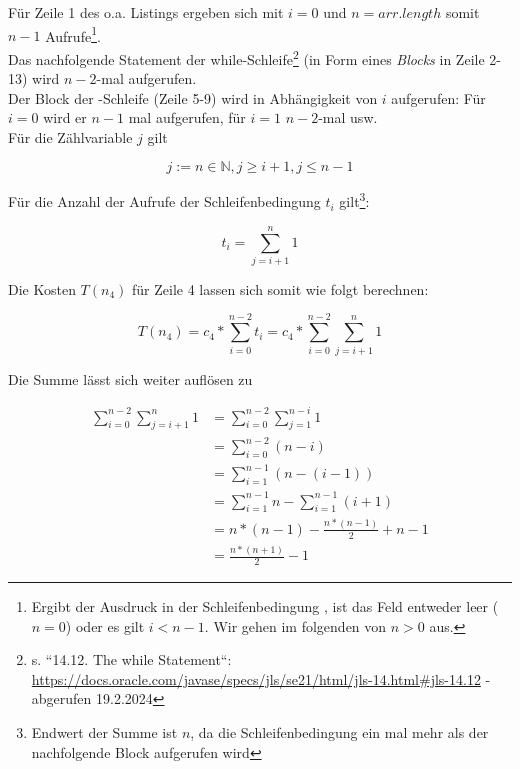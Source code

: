 \noindent
Für Zeile 1 des o.a. Listings ergeben sich mit $i = 0$ und $n=arr.length$ somit $n-1$ Aufrufe\footnote{
Ergibt der Ausdruck in der Schleifenbedingung , ist das Feld entweder leer ($n=0$) oder es gilt $i < n - 1$.
Wir gehen im folgenden von $n > 0$ aus.
}.\\
Das nachfolgende Statement der while-Schleife\footnote{
    s. ``14.12. The while Statement``: \url{https://docs.oracle.com/javase/specs/jls/se21/html/jls-14.html#jls-14.12} - abgerufen 19.2.2024
} (in Form eines \textit{Blocks} in Zeile 2-13) wird $n-2$-mal aufgerufen.\\
Der Block der -Schleife (Zeile 5-9) wird in Abhängigkeit von $i$ aufgerufen: Für $i = 0$ wird er $n - 1$ mal aufgerufen, für $i = 1$ $n - 2$-mal usw.\\

\noindent
Für die Zählvariable $j$ gilt

\begin{equation}
j := n \in \mathbb{N},  j \geq i+1, j \leq n-1
\end{equation}

\noindent
Für die Anzahl der Aufrufe der Schleifenbedingung $t_i$ gilt\footnote{Endwert der Summe ist $n$, da die Schleifenbedingung ein mal mehr als der nachfolgende Block aufgerufen wird}:

\begin{equation}
    t_i = \sum_{j=i+1}^{n} 1
\end{equation}

\noindent
Die Kosten $T(n_4)$ für Zeile 4 lassen sich somit wie folgt berechnen:

\begin{equation}
    T(n_4) = c_4 * \sum_{i=0}^{n-2} t_i = c_4 * \sum_{i=0}^{n-2} \sum_{j = i + 1}^{n} 1
\end{equation}

\noindent
Die Summe lässt sich weiter auflösen zu

\begin{equation}
\begin{split}
    \sum_{i=0}^{n-2} \sum_{j = i + 1}^{n} 1 &= \sum_{i=0}^{n-2} \sum_{j = 1}^{n-i} 1\\
    &= \sum_{i=0}^{n-2} (n - i)\\
    &= \sum_{i=1}^{n-1} (n - (i - 1)) \\
    &= \sum_{i=1}^{n-1} n - \sum_{i=1}^{n-1} (i + 1)\\
    &= n * (n - 1) - \frac{n * (n - 1)}{2} + n - 1\\
    &= \frac{n * (n + 1)}{2} - 1
\end{split}
\end{equation}


